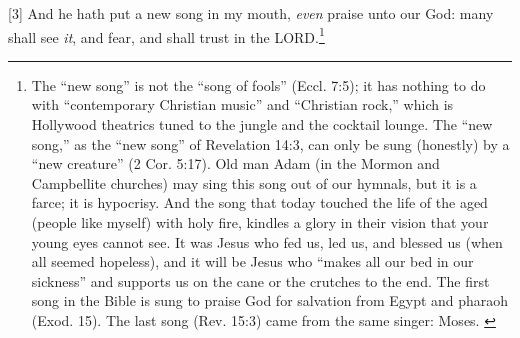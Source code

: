 [3] \textcolor[rgb]{0.00,0.00,1.00}{And he hath put a new song in my mouth, \emph{even} praise unto our God: many shall see \emph{it}, and fear, and shall trust in the LORD.}\footnote{The “new song” is not the “song of fools” (Eccl. 7:5); it has nothing to do with “contemporary Christian music” and “Christian rock,” which is Hollywood theatrics tuned to the jungle and the cocktail lounge. The “new song,” as the “new song” of Revelation 14:3, can only be sung (honestly) by a “new creature” (2 Cor. 5:17). Old man Adam (in the Mormon and Campbellite churches) may sing this song out of our hymnals, but it is a farce; it is hypocrisy. And the song that today touched the life of the aged (people like myself) with holy fire, kindles a glory in their vision that your young eyes cannot see. It was Jesus who fed us, led us, and blessed us (when all seemed hopeless), and it will be Jesus who “makes all our bed in our sickness” and supports us on the cane or the crutches to the end. The first song in the Bible is sung to praise God for salvation from Egypt and pharaoh (Exod. 15). The last song (Rev. 15:3) came from the same singer: Moses. \cite{Ruckman1992Psalms}}
